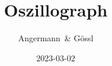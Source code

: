 \documentclass[12pt,a4paper,twoside]{article}
\begin{document}
\newcommand\laboratorynumber{10}
\title{Oszillograph}
\newcommand\supervisor{Mustermann, Max}
\newcommand\groupnumber{04}

\newcommand\participantonelastname{Angermann}
\newcommand\participantonefirstname{Leo}
\newcommand\participantoneid{11911449}
\newcommand\participanttwolastname{Gössl}
\newcommand\participanttwofirstname{Sebastian}
\newcommand\participanttwoid{11904703}
\author{\participantonelastname \ \& \participanttwolastname}

\newcommand\degreeid{UF 033 678}
\newcommand\semester{23WS}
\date{2023-03-02}

\newcommand\coursetitle{Einführung in die \\ physikalischen Messmethoden}





\tableofcontents
\newpage





\end{document}
